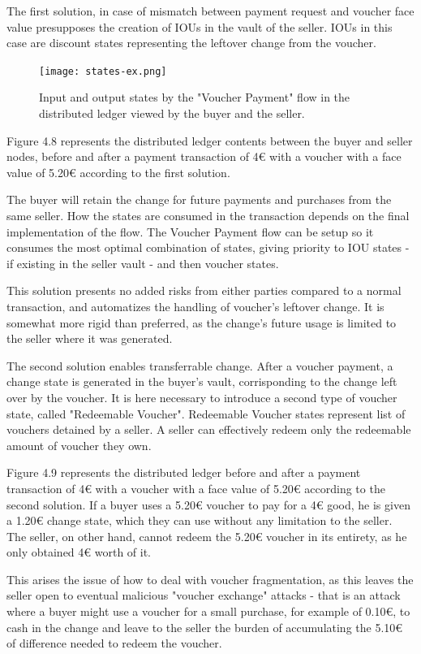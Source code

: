 The first solution, in case of mismatch between payment request and voucher face value presupposes the creation of IOUs in the vault of the seller. IOUs in this case are discount states representing the leftover change from the voucher. 

\begin{figure}[h!]
    \centering
    \texttt{[image: states-ex.png]}
    \caption{
       Input and output states by the "Voucher Payment" flow in the distributed ledger viewed by the buyer and the seller.
        }
\end{figure}

Figure 4.8 represents the distributed ledger contents between the buyer and seller nodes, before and after a payment transaction of 4€ with a voucher with a face value of 5.20€ according to the first solution. 

The buyer will retain the change for future payments and purchases from the same seller.
How the states are consumed in the transaction depends on the final implementation of the flow. The Voucher Payment flow can be setup so it consumes the most optimal combination of states, giving priority to IOU states - if existing in the seller vault - and then voucher states.

This solution presents no added risks from either parties compared to a normal transaction, and automatizes the handling of voucher's leftover change.
It is somewhat more rigid than preferred, as the change's future usage is limited to the seller where it was generated.

The second solution enables transferrable change. After a voucher payment, a change state is generated in the buyer's vault, corrisponding to the change left over by the voucher.
It is here necessary to introduce a second type of voucher state, called "Redeemable Voucher". Redeemable Voucher states represent list of vouchers detained by a seller.
A seller can effectively redeem only the redeemable amount of voucher they own. 

Figure 4.9 represents the distributed ledger before and after a payment transaction of 4€ with a voucher with a face value of 5.20€ according to the second solution. If a buyer uses a 5.20€ voucher to pay for a 4€ good, he is given a 1.20€ change state, which they can use without any limitation to the seller. 
The seller, on other hand, cannot redeem the 5.20€ voucher in its entirety, as he only obtained 4€ worth of it. 

This arises the issue of how to deal with voucher fragmentation, as this leaves the seller open to eventual malicious "voucher exchange" attacks - that is an attack where a buyer might use a voucher for a small purchase, for example of 0.10€, to cash in the change and leave to the seller the burden of accumulating the 5.10€ of difference needed to redeem the voucher. 

